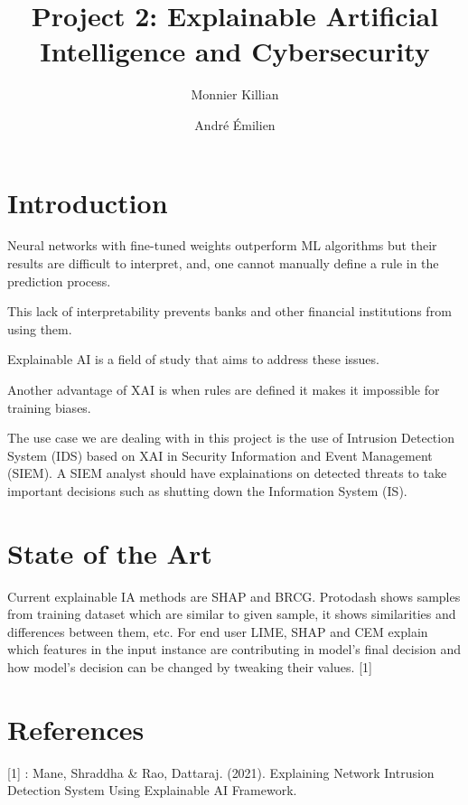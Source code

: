 \documentclass{article}
\author{Monnier Killian\and André Émilien}
\title{Project 2: Explainable Artificial Intelligence and Cybersecurity}
\begin{document}
\maketitle
\section{Introduction}
Neural networks with fine-tuned weights outperform ML algorithms but their results are difficult to interpret, and, one cannot manually define a rule in the prediction process.\par
This lack of interpretability prevents banks and other financial institutions from using them.\par
Explainable AI is a field of study that aims to address these issues.\par
Another advantage of XAI is when rules are defined it makes it impossible for training biases.\par
The use case we are dealing with in this project is the use of Intrusion Detection System (IDS) based on XAI in Security Information and Event Management (SIEM). A SIEM analyst should have explainations on detected threats to take important decisions such as shutting down the Information System (IS).
\section{State of the Art}
Current explainable IA methods are SHAP and BRCG. Protodash shows samples from training dataset which are similar to given sample, it shows similarities and differences between them, etc. For end user LIME, SHAP and CEM explain which features in the input instance are contributing in model's final decision and how model's decision can be changed by tweaking their values. [1]
\section{References}
[1] : Mane, Shraddha \& Rao, Dattaraj. (2021). Explaining Network Intrusion
Detection System Using Explainable AI Framework.
\end{document}
